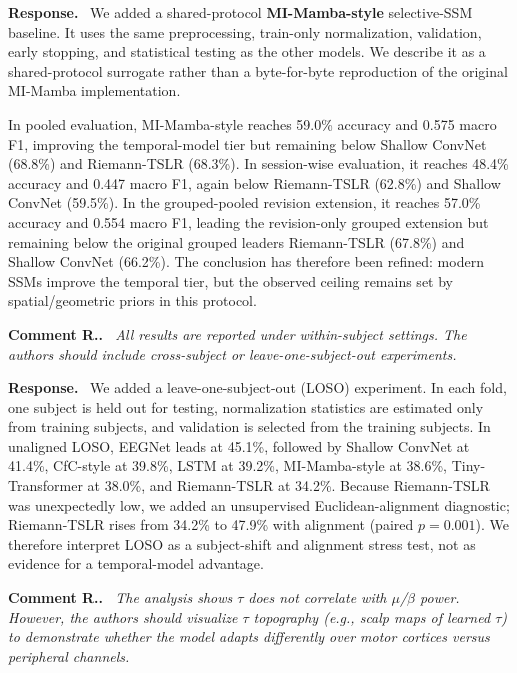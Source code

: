 \documentclass[11pt]{article}
\newcounter{reviewer}
\newcounter{point}[reviewer]
\renewcommand{\thepoint}{\thereviewer.\arabic{point}}
\newenvironment{reviewercomment}
  {\refstepcounter{point}\medskip\noindent\textbf{Comment R\thepoint.}\itshape\ }
  {\par}
\newenvironment{response}
  {\medskip\noindent\textbf{Response.}\ }
  {\par\medskip}
\begin{document}
\begin{response}
We added a shared-protocol \textbf{MI-Mamba-style} selective-SSM baseline. It uses the same preprocessing, train-only normalization, validation, early stopping, and statistical testing as the other models. We describe it as a shared-protocol surrogate rather than a byte-for-byte reproduction of the original MI-Mamba implementation.

In pooled evaluation, MI-Mamba-style reaches 59.0\% accuracy and 0.575 macro F1, improving the temporal-model tier but remaining below Shallow ConvNet (68.8\%) and Riemann-TSLR (68.3\%). In session-wise evaluation, it reaches 48.4\% accuracy and 0.447 macro F1, again below Riemann-TSLR (62.8\%) and Shallow ConvNet (59.5\%). In the grouped-pooled revision extension, it reaches 57.0\% accuracy and 0.554 macro F1, leading the revision-only grouped extension but remaining below the original grouped leaders Riemann-TSLR (67.8\%) and Shallow ConvNet (66.2\%). The conclusion has therefore been refined: modern SSMs improve the temporal tier, but the observed ceiling remains set by spatial/geometric priors in this protocol.
\end{response}

\begin{reviewercomment}
All results are reported under within-subject settings. The authors should include cross-subject or leave-one-subject-out experiments.
\end{reviewercomment}

\begin{response}
We added a leave-one-subject-out (LOSO) experiment. In each fold, one subject is held out for testing, normalization statistics are estimated only from training subjects, and validation is selected from the training subjects. In unaligned LOSO, EEGNet leads at 45.1\%, followed by Shallow ConvNet at 41.4\%, CfC-style at 39.8\%, LSTM at 39.2\%, MI-Mamba-style at 38.6\%, Tiny-Transformer at 38.0\%, and Riemann-TSLR at 34.2\%. Because Riemann-TSLR was unexpectedly low, we added an unsupervised Euclidean-alignment diagnostic; Riemann-TSLR rises from 34.2\% to 47.9\% with alignment (paired $p=0.001$). We therefore interpret LOSO as a subject-shift and alignment stress test, not as evidence for a temporal-model advantage.
\end{response}

\begin{reviewercomment}
The analysis shows $\tau$ does not correlate with $\mu$/$\beta$ power. However, the authors should visualize $\tau$ topography (e.g., scalp maps of learned $\tau$) to demonstrate whether the model adapts differently over motor cortices versus peripheral channels.
\end{reviewercomment}
\end{document}
